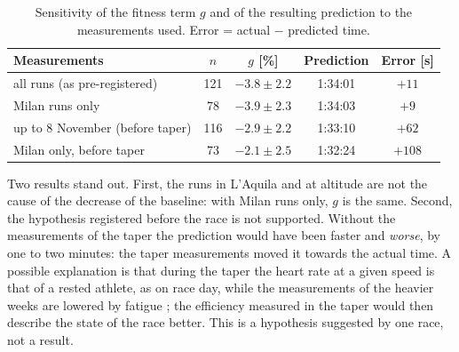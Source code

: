 \documentclass[11pt,a4paper]{article}
\begin{document}
\begin{table}[ht]
\centering
\caption{Sensitivity of the fitness term $g$ and of the resulting prediction to
the measurements used. Error = actual $-$ predicted time.}
\label{tab:checks}
\small
\begin{tabular}{@{}lcccc@{}}
\toprule
Measurements & $n$ & $g$ [\%] & Prediction & Error [s] \\
\midrule
all runs (as pre-registered)       & 121 & $-3.8 \pm 2.2$ & 1:34:01 & $+11$ \\
Milan runs only                    &  78 & $-3.9 \pm 2.3$ & 1:34:03 & $+9$ \\
up to 8 November (before taper)    & 116 & $-2.9 \pm 2.2$ & 1:33:10 & $+62$ \\
Milan only, before taper           &  73 & $-2.1 \pm 2.5$ & 1:32:24 & $+108$ \\
\bottomrule
\end{tabular}
\end{table}

Two results stand out. First, the runs in L'Aquila and at altitude are not the
cause of the decrease of the baseline: with Milan runs only, $g$ is the same.
Second, the hypothesis registered before the race is not supported. Without the
measurements of the taper the prediction would have been faster and \emph{worse},
by one to two minutes: the taper measurements moved it towards the actual time.
A possible explanation is that during the taper the heart rate at a given speed
is that of a rested athlete, as on race day, while the measurements of the
heavier weeks are lowered by fatigue \citep{bosquet2008}; the efficiency measured
in the taper would then describe the state of the race better. This is a
hypothesis suggested by one race, not a result.
\end{document}
